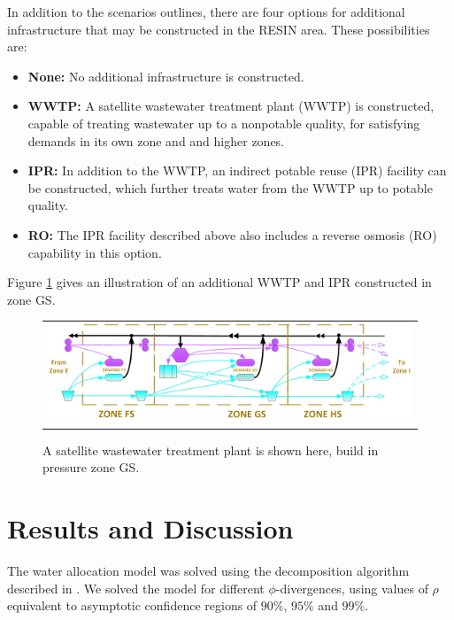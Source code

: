 \documentclass[11pt]{article}
\theoremstyle{plain}
\theoremstyle{definition}
\theoremstyle{remark}
\begin{document}
In addition to the scenarios outlines, there are four options for additional infrastructure that may be constructed in the RESIN area.
These possibilities are:
\begin{itemize}
	\item \textbf{None:} No additional infrastructure is constructed.
	\item \textbf{WWTP:} A satellite wastewater treatment plant (WWTP) is constructed, capable of treating wastewater up to a nonpotable quality, for satisfying demands in its own zone and and higher zones.
	\item \textbf{IPR:} In addition to the WWTP, an indirect potable reuse (IPR) facility can be constructed, which further treats water from the WWTP up to potable quality.
	\item \textbf{RO:} The IPR facility described above also includes a reverse osmosis (RO) capability in this option.
\end{itemize}
Figure \ref{fig:tucson_zones_wwtp} gives an illustration of an additional WWTP and IPR constructed in zone GS.

\begin{figure}
	\centering
	\begin{tabular}{c}
		\includegraphics*[width=.8\textwidth]{tucson_water_images/zones_south_ipr.png}%
	\end{tabular}
	\caption{
		A satellite wastewater treatment plant is shown here, build in pressure zone GS.
	}
		\label{fig:tucson_zones_wwtp}
\end{figure}



\section{Results and Discussion}
\label{sec:comp_water}

The water allocation model was solved using the decomposition algorithm described in \citep{love2013phi}.
We solved the model for different $\phi$-divergences, using values of $\rho$ equivalent to asymptotic confidence regions of $90\%$, $95\%$ and $99\%$.
\end{document}
